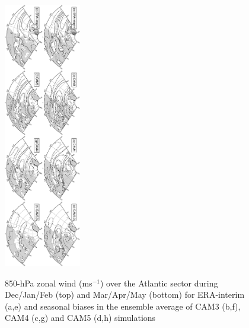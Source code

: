 \documentclass[12pt,varwidth]{article}
\begin{document}
\begin{figure}[t]
  \begin{center}
    \noindent\includegraphics[width=0.3\textwidth,angle=90.]{./figs/f_mean_U850_atl.pdf}\\
  \end{center}
  \caption{850-hPa zonal wind (ms$^{-1}$) over the Atlantic sector during Dec/Jan/Feb (top) and Mar/Apr/May (bottom) for ERA-interim (a,e) and seasonal biases in the ensemble average of CAM3 (b,f), CAM4 (c,g) and CAM5 (d,h) simulations}
\label{f_mean_U850_atl}
\end{figure}
\end{document}
